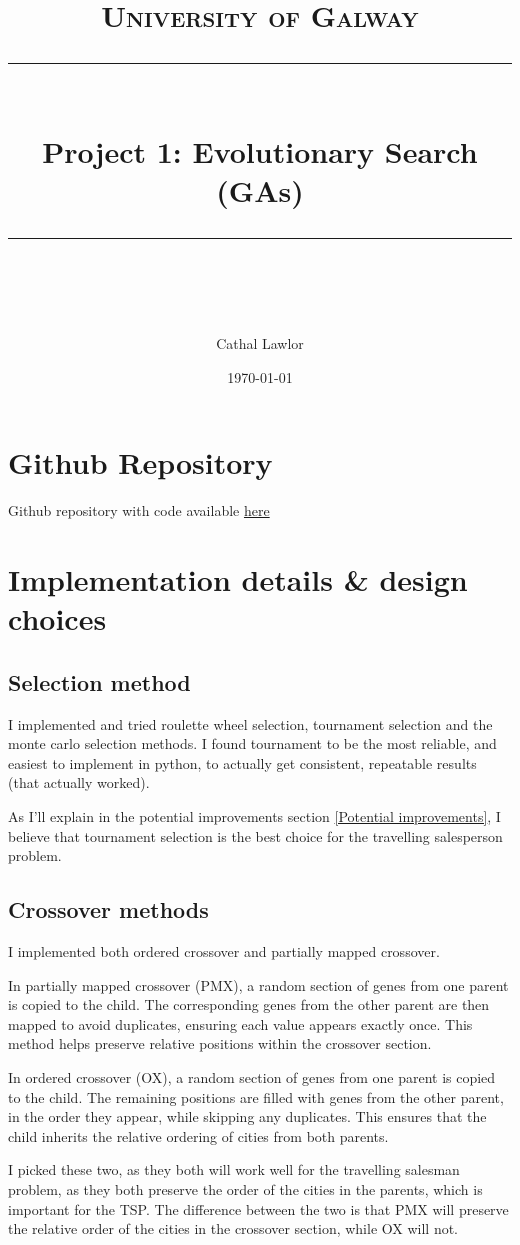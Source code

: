 \documentclass[11pt]{scrartcl} %
\title{	
	\normalfont\normalsize
	\textsc{University of Galway}\\ %
	\vspace{25pt} %
	\rule{\linewidth}{0.5pt}\\ %
	\vspace{20pt} %
	{\huge  Project 1: Evolutionary Search (GAs)}\\ %
	\vspace{12pt} %
	\rule{\linewidth}{2pt}\\ %
	\vspace{12pt} %
}
\author{\LARGE Cathal Lawlor} %
\date{\normalsize\today} %
\begin{document}
\maketitle %

\section{Github Repository}
Github repository with code available \href{https://github.com/Laan33/ai_project_1}{here}

\section{Implementation details \& design choices}

\subsection{Selection method}
I implemented and tried roulette wheel selection, tournament selection and the monte carlo selection methods.
I found tournament to be the most reliable, and easiest to implement in python, to actually get consistent, repeatable results (that actually worked).

As I'll explain in the potential improvements section \ref{Potential improvements}, I believe that tournament selection is the best choice for the travelling salesperson problem.
\subsection{Crossover methods}

I implemented both ordered crossover and partially mapped crossover. 

In partially mapped crossover (PMX)\cite{baeldung_pmx}, a random section of genes from one parent is copied to the child. The corresponding genes from the other parent are then mapped to avoid duplicates, ensuring each value appears exactly once. This method helps preserve relative positions within the crossover section.

In ordered crossover (OX)\cite{ordered_crossover_stackoverflow}, a random section of genes from one parent is copied to the child. The remaining positions are filled with genes from the other parent, in the order they appear, while skipping any duplicates. This ensures that the child inherits the relative ordering of cities from both parents.

I picked these two, as they both will work well for the travelling salesman problem, as they both preserve the order of the cities in the parents, which is important for the TSP.
The difference between the two is that PMX will preserve the relative order of the cities in the crossover section, while OX will not.
\end{document}
